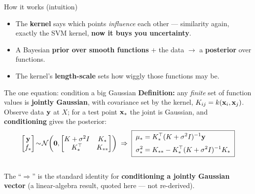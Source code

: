 \documentclass[aspectratio=169]{beamer}
\begin{document}
\begin{frame}{How it works (intuition)}
  \begin{itemize}\small
    \item The \textbf{kernel} says which points \emph{influence} each other --- similarity again,
      exactly the SVM kernel, \textbf{now it buys you uncertainty}.
    \item A Bayesian \textbf{prior over smooth functions} $+$ the data $\to$ a \textbf{posterior}
      over functions.
    \item The kernel's \textbf{length-scale} sets how wiggly those functions may be.
  \end{itemize}
  \vfill
\end{frame}

\begin{frame}{The one equation: condition a big Gaussian}
  \textbf{Definition:} any \emph{finite} set of function values is \textbf{jointly Gaussian}, with
  covariance set by the kernel, $K_{ij}=k(\mathbf{x}_i,\mathbf{x}_j)$. Observe data $\mathbf{y}$ at $X$; for a test point
  $\mathbf{x}_*$ the joint is Gaussian, and \textbf{conditioning} gives the posterior:
  \[
    \begin{bmatrix}\mathbf{y}\\ f_*\end{bmatrix}\!\sim\!\mathcal N\!\left(\mathbf 0,
      \begin{bmatrix}K+\sigma^2 I & K_*\\ K_*^\top & K_{**}\end{bmatrix}\right)
    \;\Rightarrow\;
    \boxed{\;\begin{aligned}
      \mu_* &= K_*^\top (K+\sigma^2 I)^{-1}\mathbf{y}\\[2pt]
      \sigma_*^2 &= K_{**} - K_*^\top(K+\sigma^2 I)^{-1}K_*
    \end{aligned}\;}
  \]
  \begin{columns}[T]
  \end{columns}
  \vskip 4pt
  {\footnotesize The ``$\Rightarrow$'' is the standard identity for \textbf{conditioning a jointly
  Gaussian vector} (a linear-algebra result, quoted here --- not re-derived).}
\end{frame}
\end{document}

